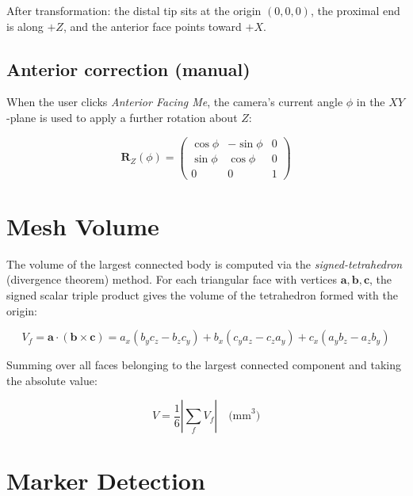 \documentclass[11pt, a4paper]{article}
\begin{document}
After transformation: the distal tip sits at the origin $(0,0,0)$, the
proximal end is along $+Z$, and the anterior face points toward $+X$.

\subsection{Anterior correction (manual)}

When the user clicks \textit{Anterior Facing Me}, the camera's current angle
$\phi$ in the $XY$-plane is used to apply a further rotation about $Z$:

\begin{equation}
  \bm{R}_Z(\phi) =
  \begin{pmatrix}
    \cos\phi & -\sin\phi & 0 \\
    \sin\phi &  \cos\phi & 0 \\
    0        & 0         & 1
  \end{pmatrix}
\end{equation}

\section{Mesh Volume}

The volume of the largest connected body is computed via the
\emph{signed-tetrahedron} (divergence theorem) method.  For each triangular
face with vertices $\bm{a}, \bm{b}, \bm{c}$, the signed scalar triple product
gives the volume of the tetrahedron formed with the origin:

\begin{equation}
  V_f = \bm{a} \cdot (\bm{b} \times \bm{c})
      = a_x(b_y c_z - b_z c_y)
      + b_x(c_y a_z - c_z a_y)
      + c_x(a_y b_z - a_z b_y)
\end{equation}

Summing over all faces belonging to the largest connected component and taking
the absolute value:

\begin{equation}
  V = \frac{1}{6}\left|\sum_{f} V_f\right|
  \quad \text{(mm}^3\text{)}
\end{equation}

\section{Marker Detection}
\end{document}
